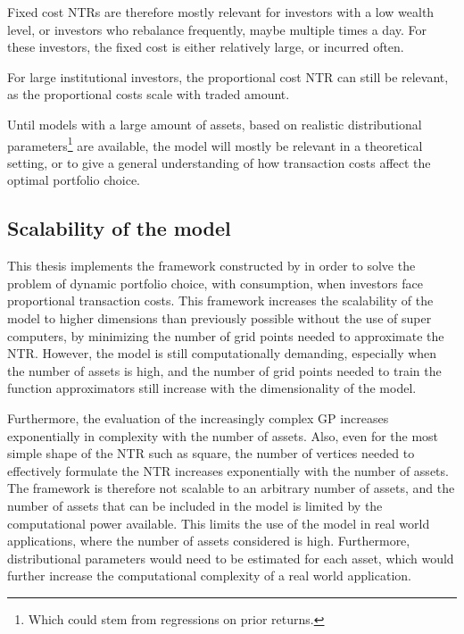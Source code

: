\documentclass[11pt]{article}
\begin{document}
Fixed cost \ac{NTR}s are therefore mostly relevant for investors with a low wealth level, or investors who rebalance frequently, maybe multiple times a day.
For these investors, the fixed cost is either relatively large, or incurred often.

For large institutional investors, the proportional cost \ac{NTR} can still be relevant, as the proportional costs scale with traded amount.

Until models with a large amount of assets, based on realistic distributional parameters\footnote{Which could stem from regressions on prior returns.} are available, the model will mostly be relevant in a theoretical setting,
or to give a general understanding of how transaction costs affect the optimal portfolio choice.

\subsection{Scalability of the model} \label{Subsection: Scalability of the model}
This thesis implements the framework constructed by \autocite{Scheidegger2023}
in order to solve the problem of dynamic portfolio choice, with consumption,
when investors face proportional transaction costs. This framework increases the scalability of the model to higher dimensions
than previously possible without the use of super computers, by minimizing the number of grid points needed to approximate the NTR.
However, the model is still computationally demanding, especially when the number of assets is high, and the number of grid points
needed to train the function approximators still increase with the dimensionality of the model.

Furthermore, the evaluation of the increasingly complex \ac{GP} increases exponentially in complexity with the number of assets.
Also, even for the most simple shape of the \ac{NTR} such as square, the number of vertices needed to effectively 
formulate the \ac{NTR} increases exponentially with the number of assets.
The framework is therefore not scalable to an arbitrary number of assets, and the number of assets that can be included in the model is limited by the computational power available.
This limits the use of the model in real world applications, where the number of assets considered is high.
Furthermore, distributional parameters would need to be estimated for each asset, which would further increase the computational complexity of
a real world application.
\end{document}
